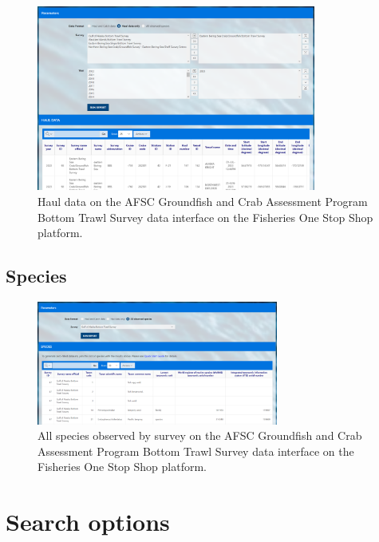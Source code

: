 \documentclass[
  letterpaper,
  oneside,
  open=any]{scrbook}
\begin{document}
\begin{figure}

{\centering \includegraphics[width=3.61in,height=\textheight]{content/../img/foss_1_interface_haul.png}

}

\caption{Haul data on the AFSC Groundfish and Crab Assessment Program
Bottom Trawl Survey data interface on the Fisheries One Stop Shop
platform.}

\end{figure}

\hypertarget{species}{%
\subsection{Species}\label{species}}

\begin{figure}

{\centering \includegraphics[width=3.12in,height=\textheight]{content/../img/foss_1_interface_species.png}

}

\caption{All species observed by survey on the AFSC Groundfish and Crab
Assessment Program Bottom Trawl Survey data interface on the Fisheries
One Stop Shop platform.}

\end{figure}

\hypertarget{search-options}{%
\section{Search options}\label{search-options}}
\end{document}
